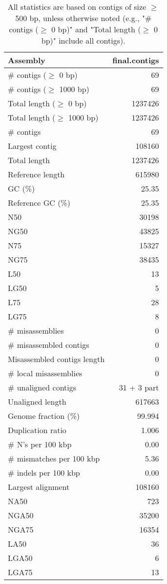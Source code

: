\documentclass[12pt,a4paper]{article}
\begin{document}
\begin{table}[ht]
\begin{center}
\caption{All statistics are based on contigs of size $\geq$ 500 bp, unless otherwise noted (e.g., "\# contigs ($\geq$ 0 bp)" and "Total length ($\geq$ 0 bp)" include all contigs).}
\begin{tabular}{|l*{1}{|r}|}
\hline
Assembly & final.contigs \\ \hline
\# contigs ($\geq$ 0 bp) & 69 \\ \hline
\# contigs ($\geq$ 1000 bp) & 69 \\ \hline
Total length ($\geq$ 0 bp) & 1237426 \\ \hline
Total length ($\geq$ 1000 bp) & 1237426 \\ \hline
\# contigs & 69 \\ \hline
Largest contig & 108160 \\ \hline
Total length & 1237426 \\ \hline
Reference length & 615980 \\ \hline
GC (\%) & 25.35 \\ \hline
Reference GC (\%) & 25.35 \\ \hline
N50 & 30198 \\ \hline
NG50 & 43825 \\ \hline
N75 & 15327 \\ \hline
NG75 & 38435 \\ \hline
L50 & 13 \\ \hline
LG50 & 5 \\ \hline
L75 & 28 \\ \hline
LG75 & 8 \\ \hline
\# misassemblies & 0 \\ \hline
\# misassembled contigs & 0 \\ \hline
Misassembled contigs length & 0 \\ \hline
\# local misassemblies & 0 \\ \hline
\# unaligned contigs & 31 + 3 part \\ \hline
Unaligned length & 617663 \\ \hline
Genome fraction (\%) & 99.994 \\ \hline
Duplication ratio & 1.006 \\ \hline
\# N's per 100 kbp & 0.00 \\ \hline
\# mismatches per 100 kbp & 5.36 \\ \hline
\# indels per 100 kbp & 0.00 \\ \hline
Largest alignment & 108160 \\ \hline
NA50 & 723 \\ \hline
NGA50 & 35200 \\ \hline
NGA75 & 16354 \\ \hline
LA50 & 36 \\ \hline
LGA50 & 6 \\ \hline
LGA75 & 13 \\ \hline
\end{tabular}
\end{center}
\end{table}
\end{document}
